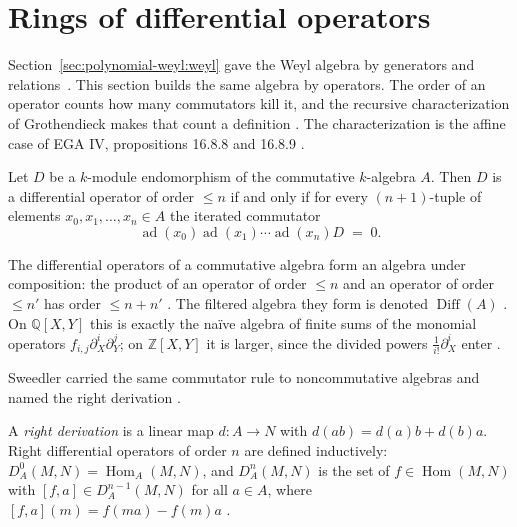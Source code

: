 \section{Rings of differential operators}\label{sec:polynomial-weyl:differential-operators}

Section~\ref{sec:polynomial-weyl:weyl} gave the Weyl algebra by
generators and relations~\cite[p.~5]{Hazewinkel2013}. This section builds the same algebra by
operators. The order of an operator counts how many commutators kill it,
and the recursive characterization of Grothendieck makes that count a
definition \cite[Theorem~6.2, p.~4]{Hazewinkel2013}. The characterization
is the affine case of EGA IV, propositions 16.8.8 and 16.8.9
\cite[p.~5]{Hazewinkel2013}.

\begin{theorem}
\label{thm:pw:diffop-order}
Let $D$ be a $k$-module endomorphism of the commutative $k$-algebra $A$.
Then $D$ is a differential operator of order $\leq n$ if and only if for
every $(n+1)$-tuple of elements $x_{0},x_{1},\dots,x_{n}\in A$ the
iterated commutator
\[
\operatorname{ad}(x_{0})\operatorname{ad}(x_{1})\cdots
\operatorname{ad}(x_{n})D \;=\; 0 .
\]
\end{theorem}

The differential operators of a commutative algebra form an algebra under
composition: the product of an operator of order $\leq n$ and an operator
of order $\leq n'$ has order $\leq n+n'$
\cite[6.4, p.~5]{Hazewinkel2013}. The filtered algebra they form is
denoted $\operatorname{Diff}(A)$ \cite[6.4, p.~5]{Hazewinkel2013}. On
$\mathbb{Q}[X,Y]$ this is exactly the na\"ive algebra of finite sums of
the monomial operators $f_{i,j}\partial_{X}^{i}\partial_{Y}^{j}$; on
$\mathbb{Z}[X,Y]$ it is larger, since the divided powers
$\frac{1}{i!}\partial_{X}^{i}$ enter \cite[6.4, p.~5]{Hazewinkel2013}.

Sweedler carried the same commutator rule to noncommutative algebras and
named the right derivation \cite[p.~29]{Sweedler1980}.

\begin{remark}\label{rem:pw:sweedler-right}
A \emph{right derivation} is a linear map $d\colon A\to N$ with
$d(ab)=d(a)b+d(b)a$. Right differential operators of order $n$ are defined
inductively: $D^{0}_{A}(M,N)=\operatorname{Hom}_{A}(M,N)$, and
$D^{n}_{A}(M,N)$ is the set of $f\in\operatorname{Hom}(M,N)$ with
$[f,a]\in D^{n-1}_{A}(M,N)$ for all $a\in A$, where
$[f,a](m)=f(ma)-f(m)a$ \cite[p.~29]{Sweedler1980}.
\end{remark}

